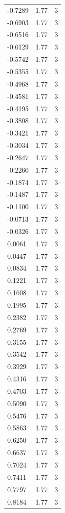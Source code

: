 \begin{longtable}{lrr}
  -0.7289 & 1.77 & 3 \\
  -0.6903 & 1.77 & 3 \\
  -0.6516 & 1.77 & 3 \\
  -0.6129 & 1.77 & 3 \\
  -0.5742 & 1.77 & 3 \\
  -0.5355 & 1.77 & 3 \\
  -0.4968 & 1.77 & 3 \\
  -0.4581 & 1.77 & 3 \\
  -0.4195 & 1.77 & 3 \\
  -0.3808 & 1.77 & 3 \\
  -0.3421 & 1.77 & 3 \\
  -0.3034 & 1.77 & 3 \\
  -0.2647 & 1.77 & 3 \\
  -0.2260 & 1.77 & 3 \\
  -0.1874 & 1.77 & 3 \\
  -0.1487 & 1.77 & 3 \\
  -0.1100 & 1.77 & 3 \\
  -0.0713 & 1.77 & 3 \\
  -0.0326 & 1.77 & 3 \\
  0.0061 & 1.77 & 3 \\
  0.0447 & 1.77 & 3 \\
  0.0834 & 1.77 & 3 \\
  0.1221 & 1.77 & 3 \\
  0.1608 & 1.77 & 3 \\
  0.1995 & 1.77 & 3 \\
  0.2382 & 1.77 & 3 \\
  0.2769 & 1.77 & 3 \\
  0.3155 & 1.77 & 3 \\
  0.3542 & 1.77 & 3 \\
  0.3929 & 1.77 & 3 \\
  0.4316 & 1.77 & 3 \\
  0.4703 & 1.77 & 3 \\
  0.5090 & 1.77 & 3 \\
  0.5476 & 1.77 & 3 \\
  0.5863 & 1.77 & 3 \\
  0.6250 & 1.77 & 3 \\
  0.6637 & 1.77 & 3 \\
  0.7024 & 1.77 & 3 \\
  0.7411 & 1.77 & 3 \\
  0.7797 & 1.77 & 3 \\
  0.8184 & 1.77 & 3 \\

\end{longtable}
